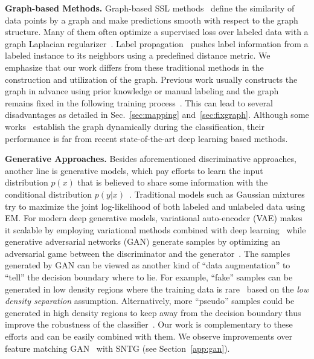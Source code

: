 \documentclass[10pt,twocolumn,letterpaper]{article}
\begin{document}
\textbf{Graph-based Methods.}
Graph-based SSL methods~\cite{zhu2002learning,zhu2003semi,zhou2004learning} define the similarity of data points by a graph and make predictions smooth with respect to the graph structure. Many of them often optimize a supervised loss over labeled data with a graph Laplacian regularizer~\cite{belkin2006manifold,gong2015deformed}. Label propagation~\cite{zhu2002learning} pushes label information from a labeled instance to its neighbors using a predefined distance metric. We emphasize that our work differs from these traditional methods in the construction and utilization of the graph. Previous work usually constructs the graph in advance using prior knowledge or manual labeling and the graph remains fixed in the following training process~\cite{belkin2006manifold, weston2008deep}. This can lead to several disadvantages as detailed in Sec.~\ref{sec:mapping} and~\ref{sec:fixgraph}. Although some works~\cite{wang2013dynamic} establish the graph dynamically during the classification, their performance is far from recent state-of-the-art deep learning based methods.

\textbf{Generative Approaches.}
Besides aforementioned discriminative approaches, another line is generative models, which pay efforts to learn the input distribution $p(x)$ that is believed to share some information with the conditional distribution $p(y|x)$~\cite{lasserre2006principled}. Traditional models such as Gaussian mixtures~\cite{zhu2006semi} try to maximize the joint log-likelihood of both labeled and unlabeled data using EM.
For modern deep generative models, variational auto-encoder (VAE) makes it scalable by employing variational methods combined with deep learning~\cite{kingma2014semi} while generative adversarial networks (GAN) generate samples by optimizing an adversarial game between the discriminator and the generator~\cite{springenberg2015unsupervised,salimans2016improved,li2017triple,dai2017good}. The samples generated by GAN can be viewed as another kind of ``data augmentation'' to ``tell'' the decision boundary where to lie. For example, ``fake'' samples can be generated in low density regions where the training data is rare~\cite{salimans2016improved,dai2017good} based on the \emph{low density separation} assumption. Alternatively, more ``pseudo'' samples could be generated in high density regions to keep away from the decision boundary thus improve the robustness of the classifier~\cite{li2017triple}. Our work is complementary to these efforts and can be easily combined with them. We observe improvements over feature matching GAN~\cite{salimans2016improved} with SNTG (see Section~\ref{app:gan}).
\end{document}
